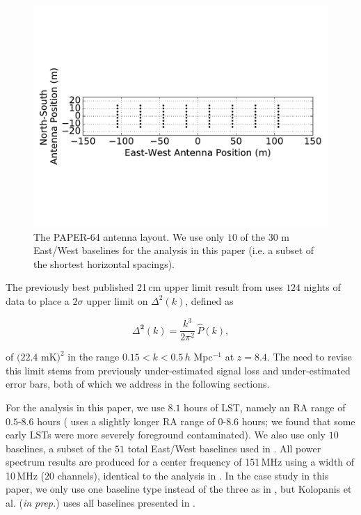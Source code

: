 \documentclass[preprint2,numberedappendix,tighten]{aastex6}  %
\begin{document}
\begin{figure}
	\centering
	\includegraphics[trim={0cm 3cm 0cm 3cm},width=\columnwidth]{plots/ant_layout_aspect.pdf}
	\caption{The PAPER-64 antenna layout. We use only $10$ of the $30$ m East/West baselines for the analysis in this 
paper (i.e. a subset of the shortest horizontal spacings).}
	\label{fig:ant_layout}
\end{figure}

The previously best published 21\,cm upper limit result from  uses $124$ nights of data to place a $2\sigma$ upper limit 
on $\Delta^{2}(k)$, defined as

\begin{equation}
\Delta^{\textbf{2}}(k) = \frac{k^{3}}{2\pi^{2}}\,\hat{P}(k),
\end{equation}

\noindent of $(22.4$ mK$)^{2}$ in the range $0.15 < k < 0.5$\,$h$ Mpc$^{-1}$ at $z = 8.4$. The need to revise this limit stems from previously under-estimated signal loss and under-estimated error bars, both of which we 
address in the following sections. 

For the analysis in this paper, we use $8.1$ hours of LST, namely an RA range of $0.5$-$8.6$ hours ( uses a slightly longer RA 
range of $0$-$8.6$ hours; we found that some early LSTs were more severely foreground contaminated). We also use only $10$ baselines, a subset of the $51$ total East/West baselines used in . All power spectrum results are produced for a center frequency of 151\,MHz using a width of 10\,MHz ($20$ channels), identical to the analysis in . In the case study in this paper, we only use one baseline type instead of the three as in 
, but Kolopanis et al. (\textit{in prep.}) uses all baselines presented in .
\end{document}
